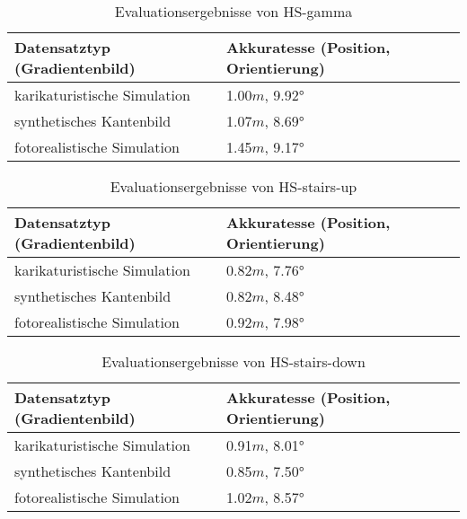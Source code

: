 \begin{table}
	\centering
	\caption{Evaluationsergebnisse von HS-gamma}
	\begin{tabularx}{0.75\textwidth}{X X}\textbf{Datensatztyp} \hspace{2cm} (Gradientenbild)& \textbf{Akkuratesse} \hspace{2cm} (Position, Orientierung)\\
		\hline
		karikaturistische Simulation & 1.00$m$, 9.92°\\
		\hline
		synthetisches Kantenbild & 1.07$m$, 8.69°\\
		\hline
		fotorealistische Simulation & 1.45$m$, 9.17°\\
	\end{tabularx}
	\label{tab:synth_hs_gamma}
\end{table}


\begin{table}
	\centering
	\caption{Evaluationsergebnisse von HS-stairs-up}
	\begin{tabularx}{0.75\textwidth}{X X}\textbf{Datensatztyp} \hspace{2cm} (Gradientenbild)& \textbf{Akkuratesse} \hspace{2cm} (Position, Orientierung)\\
		\hline
		karikaturistische Simulation & 0.82$m$, 7.76°\\
		\hline
		synthetisches Kantenbild & 0.82$m$, 8.48°\\
		\hline
		fotorealistische Simulation & 0.92$m$, 7.98°\\
	\end{tabularx}
	\label{tab:synth_hs_stairs_up}
\end{table}



\begin{table}
	\centering
	\caption{Evaluationsergebnisse von HS-stairs-down}
	\begin{tabularx}{0.75\textwidth}{X X}\textbf{Datensatztyp} \hspace{2cm} (Gradientenbild)& \textbf{Akkuratesse} \hspace{2cm} (Position, Orientierung)\\
		\hline
		karikaturistische Simulation & 0.91$m$, 8.01°\\
		\hline
		synthetisches Kantenbild & 0.85$m$, 7.50°\\
		\hline
		fotorealistische Simulation & 1.02$m$, 8.57°\\
	\end{tabularx}
	\label{tab:synth_hs_stairs_down}
\end{table}

